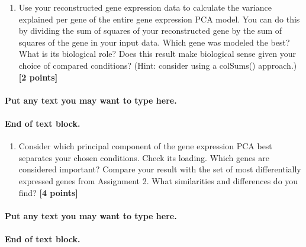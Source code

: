 \documentclass[
]{article}
\providecommand{\tightlist}{%
  \setlength{\itemsep}{0pt}\setlength{\parskip}{0pt}}
\begin{document}
\begin{enumerate}
\def\labelenumi{\Alph{enumi})}
\setcounter{enumi}{5}
\tightlist
\item
  Use your reconstructed gene expression data to calculate the variance
  explained per gene of the entire gene expression PCA model. You can do
  this by dividing the sum of squares of your reconstructed gene by the
  sum of squares of the gene in your input data. Which gene was modeled
  the best? What is its biological role? Does this result make
  biological sense given your choice of compared conditions? (Hint:
  consider using a colSums() approach.) \textbf{{[}2 points{]}}
\end{enumerate}

\hypertarget{put-any-text-you-may-want-to-type-here.-18}{%
\paragraph{Put any text you may want to type
here.}\label{put-any-text-you-may-want-to-type-here.-18}}

\hypertarget{end-of-text-block.-20}{%
\paragraph{End of text block.}\label{end-of-text-block.-20}}

\begin{enumerate}
\def\labelenumi{\Alph{enumi})}
\setcounter{enumi}{6}
\tightlist
\item
  Consider which principal component of the gene expression PCA best
  separates your chosen conditions. Check its loading. Which genes are
  considered important? Compare your result with the set of most
  differentially expressed genes from Assignment 2. What similarities
  and differences do you find? \textbf{{[}4 points{]}}
\end{enumerate}

\hypertarget{put-any-text-you-may-want-to-type-here.-19}{%
\paragraph{Put any text you may want to type
here.}\label{put-any-text-you-may-want-to-type-here.-19}}

\hypertarget{end-of-text-block.-21}{%
\paragraph{End of text block.}\label{end-of-text-block.-21}}
\end{document}
